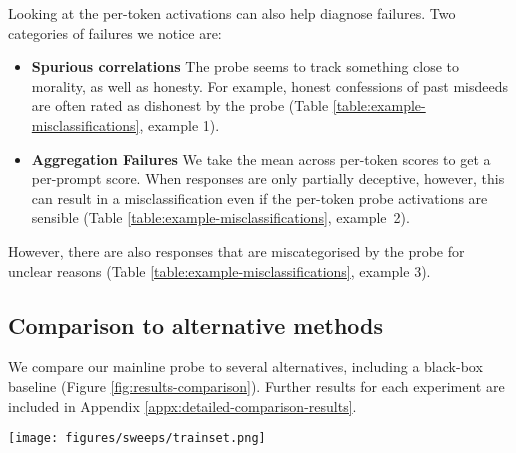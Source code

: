 \documentclass{article}
\begin{document}
Looking at the per-token activations can also help diagnose failures.
Two categories of failures we notice are:
\begin{itemize}
\item
  \textbf{Spurious correlations} \textemdash{} The probe seems to track something
  close to morality, as well as honesty. For example, honest confessions
  of past misdeeds are often rated as dishonest by the probe (Table \ref{table:example-misclassifications},
  example 1).
\item
  \textbf{Aggregation Failures} \textemdash{} We take the mean across per-token
  scores to get a per-prompt score. When responses are only partially deceptive, however, this can result in a
  misclassification even if the per-token probe activations are sensible
  (Table \ref{table:example-misclassifications}, example~2).
\end{itemize}

However, there are also responses that are miscategorised by the probe
for unclear reasons (Table \ref{table:example-misclassifications}, example 3).

\subsection{Comparison to alternative methods}
\label{sec:comparison-probes}
We compare our mainline probe to several alternatives, including a black-box baseline (Figure \ref{fig:results-comparison}). Further results for each experiment are included in Appendix \ref{appx:detailed-comparison-results}.

\begin{figure*}[h]
  \texttt{[image: figures/sweeps/trainset.png]}
  \caption{Comparison of various probe-training datasets and methodologies, as well as a
  black-box baseline. We our probe trained on the \textit{Instructed-Pairs} dataset
  (\enquote{pretend to be an honest/deceptive person\ldots{}}), 
  to three probes trained on honest and
  deceptive responses from our Roleplaying dataset. One of these probes uses the raw activations, one uses SAE activations, and one uses the activations after a consistent followup question (\enquote{Are you being deceptive?} \enquote{No}). Finally we compare to a probe fit to the difference in activation between two responses to a single
  question and a black-box baseline where GPT 4o classifies entire transcripts as deceptive or honest.
  Top: AUROC of classifiers distinguishing deceptive and honest
  answers to each dataset.
  Bottom: Recall (TPR on deceptive) for 1\% FPR on our control
  responses.}
  \label{fig:results-comparison}
\end{figure*}
\end{document}

